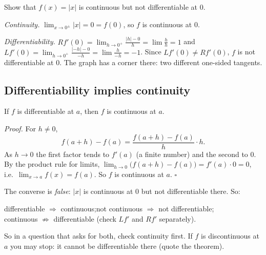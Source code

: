 \begin{center}
\end{center}

\begin{example}
Show that $f(x)=|x|$ is continuous but not differentiable at $0$.
\end{example}
\begin{solution}
\emph{Continuity.} $\lim_{x\to0^\pm}|x|=0=f(0)$, so $f$ is continuous at $0$.

\emph{Differentiability.} $Rf'(0)=\lim_{h\to0^+}\frac{|h|-0}{h}=\lim\frac hh=1$ and $Lf'(0)=\lim_{h\to0^+}\frac{|-h|-0}{-h}=\lim\frac{h}{-h}=-1$. Since $Lf'(0)\ne Rf'(0)$, $f$ is not differentiable at $0$. The graph has a corner there: two different one-sided tangents.
\end{solution}

\subsection{Differentiability implies continuity}
\begin{theorem}
If $f$ is differentiable at $a$, then $f$ is continuous at $a$.
\end{theorem}
\emph{Proof.} For $h\ne0$,
\[
f(a+h)-f(a)=\frac{f(a+h)-f(a)}{h}\cdot h .
\]
As $h\to0$ the first factor tends to $f'(a)$ (a finite number) and the second to $0$. By the product rule for limits, $\lim_{h\to0}\bigl(f(a+h)-f(a)\bigr)=f'(a)\cdot0=0$, i.e.\ $\lim_{x\to a}f(x)=f(a)$. So $f$ is continuous at $a$. $\square$

The converse is \emph{false}: $|x|$ is continuous at $0$ but not differentiable there. So:
\begin{keybox}
differentiable $\Longrightarrow$ continuous;\qquad not continuous $\Longrightarrow$ not differentiable;\\
continuous $\not\Longrightarrow$ differentiable (check $Lf'$ and $Rf'$ separately).
\end{keybox}
So in a question that asks for both, check continuity first. If $f$ is discontinuous at $a$ you may stop: it cannot be differentiable there (quote the theorem).


